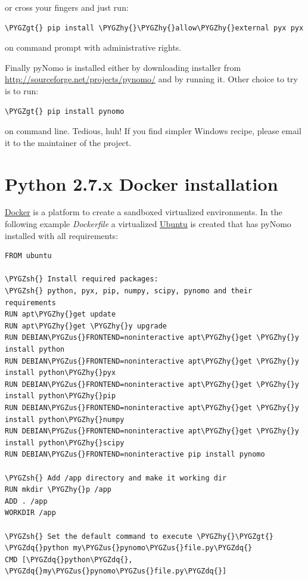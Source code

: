 \documentclass[a4paper,11pt,english]{sphinxmanual}
\def\PYGZus{\char`\_}
\def\PYGZgt{\char`\>}
\def\PYGZsh{\char`\#}
\def\PYGZhy{\char`\-}
\def\PYGZdq{\char`\"}
\begin{document}
or cross your fingers and just run:

\begin{Verbatim}[commandchars=\\\{\},formatcom=\scriptsize]
\PYGZgt{} pip install \PYGZhy{}\PYGZhy{}allow\PYGZhy{}external pyx pyx
\end{Verbatim}

on command prompt with administrative rights.

Finally pyNomo is installed either by downloading installer from  \href{http://sourceforge.net/projects/pynomo/files/pynomo/}{http://sourceforge.net/projects/pynomo/} and by running it. Other choice to try is to run:

\begin{Verbatim}[commandchars=\\\{\},formatcom=\scriptsize]
\PYGZgt{} pip install pynomo
\end{Verbatim}

on command line. Tedious, huh! If you find simpler Windows recipe, please email it to the maintainer of the project.


\section{Python 2.7.x Docker installation}
\label{installation/installation:python-2-7-x-docker-installation}
\href{https://www.docker.com/}{Docker} is a platform to create a sandboxed virtualized environments. In the following example \emph{Dockerfile} a virtualized
\href{http://ubuntu.com/}{Ubuntu} is created that has pyNomo installed with all requirements:

\begin{Verbatim}[commandchars=\\\{\},formatcom=\scriptsize]
FROM ubuntu

\PYGZsh{} Install required packages:
\PYGZsh{} python, pyx, pip, numpy, scipy, pynomo and their requirements
RUN apt\PYGZhy{}get update
RUN apt\PYGZhy{}get \PYGZhy{}y upgrade
RUN DEBIAN\PYGZus{}FRONTEND=noninteractive apt\PYGZhy{}get \PYGZhy{}y install python
RUN DEBIAN\PYGZus{}FRONTEND=noninteractive apt\PYGZhy{}get \PYGZhy{}y install python\PYGZhy{}pyx
RUN DEBIAN\PYGZus{}FRONTEND=noninteractive apt\PYGZhy{}get \PYGZhy{}y install python\PYGZhy{}pip
RUN DEBIAN\PYGZus{}FRONTEND=noninteractive apt\PYGZhy{}get \PYGZhy{}y install python\PYGZhy{}numpy
RUN DEBIAN\PYGZus{}FRONTEND=noninteractive apt\PYGZhy{}get \PYGZhy{}y install python\PYGZhy{}scipy
RUN DEBIAN\PYGZus{}FRONTEND=noninteractive pip install pynomo

\PYGZsh{} Add /app directory and make it working dir
RUN mkdir \PYGZhy{}p /app
ADD . /app
WORKDIR /app

\PYGZsh{} Set the default command to execute \PYGZhy{}\PYGZgt{} \PYGZdq{}python my\PYGZus{}pynomo\PYGZus{}file.py\PYGZdq{}
CMD [\PYGZdq{}python\PYGZdq{}, \PYGZdq{}my\PYGZus{}pynomo\PYGZus{}file.py\PYGZdq{}]
\end{Verbatim}
\end{document}
